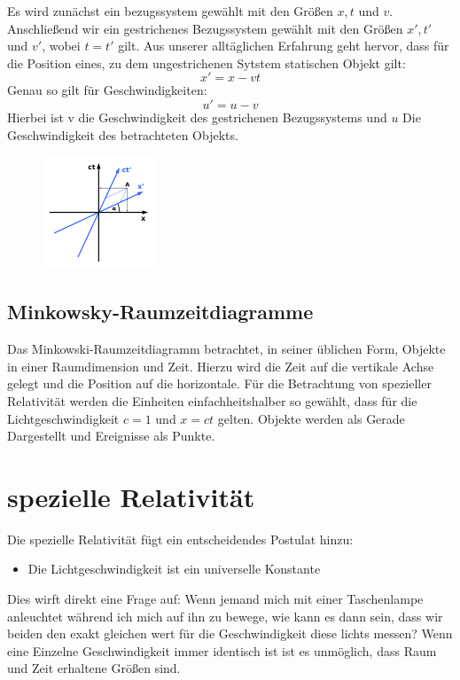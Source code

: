 \documentclass[12pt]{article}
\begin{document}
Es wird zunächst ein bezugssystem gewählt mit den Größen $x, t$ und $v$.
Anschließend wir ein gestrichenes Bezugssystem gewählt mit den Größen $x', t'$ und $v'$, wobei $t = t'$ gilt.
Aus unserer alltäglichen Erfahrung geht hervor, dass für die Position eines, zu dem ungestrichenen Sytstem statischen Objekt gilt: 
\begin{equation}
x' = x-vt
\end{equation}
Genau so gilt für Geschwindigkeiten:
\begin{equation}
\label{vnewton}
u' =u - v
\end{equation}
Hierbei ist v die Geschwindigkeit des gestrichenen Bezugssystems und $u$ Die Geschwindigkeit des betrachteten Objekts.

\begin{figure}
\centering
\includegraphics[width=0.3\textwidth]{Minkowski_diagram.png}
\end{figure}
\subsection{Minkowsky-Raumzeitdiagramme}
Das Minkowski-Raumzeitdiagramm betrachtet, in seiner üblichen Form, Objekte in einer Raumdimension und Zeit.
Hierzu wird die Zeit auf die vertikale Achse gelegt und die Position auf die horizontale.
Für die Betrachtung von spezieller Relativität werden die Einheiten einfachheitshalber so gewählt, dass für die Lichtgeschwindigkeit $c = 1$ und $x = ct$ gelten.
Objekte werden als Gerade Dargestellt und Ereignisse als Punkte.

\section{spezielle Relativität}
Die spezielle Relativität fügt ein entscheidendes Postulat hinzu:
\begin{itemize}
\item Die Lichtgeschwindigkeit ist ein universelle Konstante
\end{itemize}
Dies wirft direkt eine Frage auf:
Wenn jemand mich mit einer Taschenlampe anleuchtet während ich mich auf ihn zu bewege, wie kann es dann sein, dass wir beiden den exakt gleichen wert für die Geschwindigkeit diese lichts messen?
Wenn eine Einzelne Geschwindigkeit immer identisch ist ist es unmöglich, dass Raum und Zeit erhaltene Größen sind.
\end{document}
